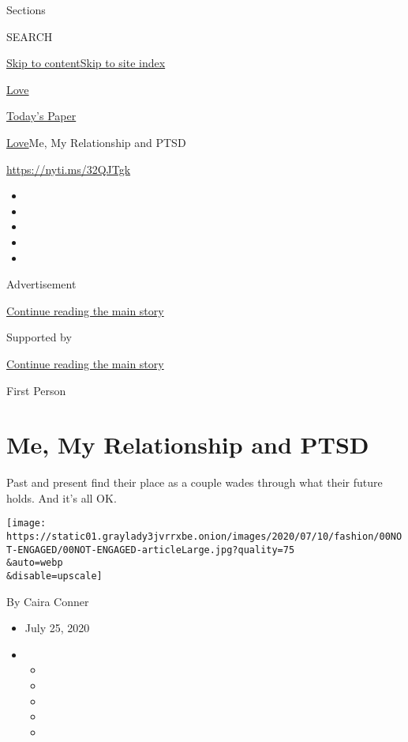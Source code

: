 Sections

SEARCH

\protect\hyperlink{site-content}{Skip to
content}\protect\hyperlink{site-index}{Skip to site index}

\href{https://www.nytimes3xbfgragh.onion/section/fashion/weddings}{Love}

\href{https://myaccount.nytimes3xbfgragh.onion/auth/login?response_type=cookie\&client_id=vi}{}

\href{https://www.nytimes3xbfgragh.onion/section/todayspaper}{Today's
Paper}

\href{/section/fashion/weddings}{Love}\textbar{}Me, My Relationship and
PTSD

\url{https://nyti.ms/32QJTgk}

\begin{itemize}
\item
\item
\item
\item
\item
\end{itemize}

Advertisement

\protect\hyperlink{after-top}{Continue reading the main story}

Supported by

\protect\hyperlink{after-sponsor}{Continue reading the main story}

First Person

\hypertarget{me-my-relationship-and-ptsd}{%
\section{Me, My Relationship and
PTSD}\label{me-my-relationship-and-ptsd}}

Past and present find their place as a couple wades through what their
future holds. And it's all OK.

\texttt{[image: https://static01.graylady3jvrrxbe.onion/images/2020/07/10/fashion/00NOT-ENGAGED/00NOT-ENGAGED-articleLarge.jpg?quality=75\\\&auto=webp\\\&disable=upscale]}

By Caira Conner

\begin{itemize}
\item
  July 25, 2020
\item
  \begin{itemize}
  \item
  \item
  \item
  \item
  \item
  \end{itemize}
\end{itemize}

